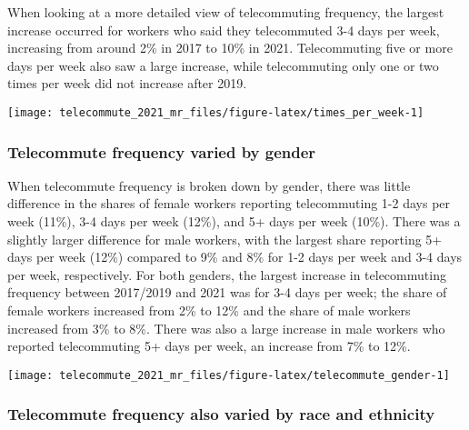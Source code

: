 \documentclass[
  12pt,
]{article}
\begin{document}
\begin{flushleft}
When looking at a more detailed view of telecommuting frequency, the largest increase occurred for workers who said they telecommuted 3-4 days per week, increasing from around 2\% in 2017 to 10\% in 2021. Telecommuting five or more days per week also saw a large increase, while telecommuting only one or two times per week did not increase after 2019.
\end{flushleft}

\begin{center}\texttt{[image: telecommute\_2021\_mr\_files/figure-latex/times\_per\_week-1]} \end{center}

\hypertarget{telecommute-frequency-varied-by-gender}{%
\subsubsection{Telecommute frequency varied by
gender}\label{telecommute-frequency-varied-by-gender}}

\begin{flushleft}
When telecommute frequency is broken down by gender, there was little difference in the shares of female workers reporting telecommuting 1-2 days per week (11\%), 3-4 days per week (12\%), and 5+ days per week (10\%). There was a slightly larger difference for male workers, with the largest share reporting 5+ days per week (12\%) compared to 9\% and 8\% for 1-2 days per week and 3-4 days per week, respectively. For both genders, the largest increase in telecommuting frequency between 2017/2019 and 2021 was for 3-4 days per week; the share of female workers increased from 2\% to 12\% and the share of male workers increased from 3\% to 8\%. There was also a large increase in male workers who reported telecommuting 5+ days per week, an increase from 7\% to 12\%.
\end{flushleft}

\begin{center}\texttt{[image: telecommute\_2021\_mr\_files/figure-latex/telecommute\_gender-1]} \end{center}

\hypertarget{telecommute-frequency-also-varied-by-race-and-ethnicity}{%
\subsubsection{Telecommute frequency also varied by race and
ethnicity}\label{telecommute-frequency-also-varied-by-race-and-ethnicity}}
\end{document}
